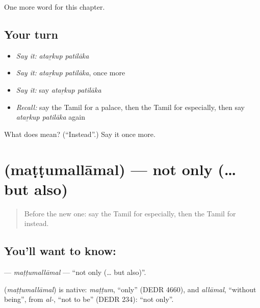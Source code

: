 \begin{grammarlens}[title={What you've built}]
One more word for this chapter.
\end{grammarlens}

\subsection*{Your turn}
\begin{itemize}
\raggedright
  \item \emph{Say it:} \emph{ataṟkup patilāka}
  \item \emph{Say it:} \emph{ataṟkup patilāka}, once more
  \item \emph{Say it:} say \emph{ataṟkup patilāka}
  \item \emph{Recall:} say the Tamil for a palace, then the Tamil for especially, then say \emph{ataṟkup patilāka} again
\end{itemize}

\begin{tcolorbox}[breakable,colback=teal!4,colframe=teal!35!black,title={Before you move on}]
What does   mean? (\textquotedblleft{}Instead\textquotedblright{}.) Say it once more.
\end{tcolorbox}
\section[\texorpdfstring{\ta{மட்டுமல்லாமல்} (maṭṭumallāmal)}{மட்டுமல்லாமல் (maṭṭumallāmal)}]{ (maṭṭumallāmal) — not only (… but also)}

\label{lesson:TA-C237-mattumallamal}



\begin{quote}
Before the new one: say the Tamil for especially, then the Tamil for instead.
\end{quote}

\subsection*{You'll want to know: }
\textbf{} — \emph{maṭṭumallāmal} — \textquotedblleft{}not only (… but also)\textquotedblright{}.

\begin{cousinweb}
\textbf{} (\emph{maṭṭumallāmal}) is native: \emph{maṭṭum}, \textquotedblleft{}only\textquotedblright{} (DEDR 4660), and \emph{allāmal}, \textquotedblleft{}without being\textquotedblright{}, from \emph{al-}, \textquotedblleft{}not to be\textquotedblright{} (DEDR 234): \textquotedblleft{}not only\textquotedblright{}.
\end{cousinweb}

